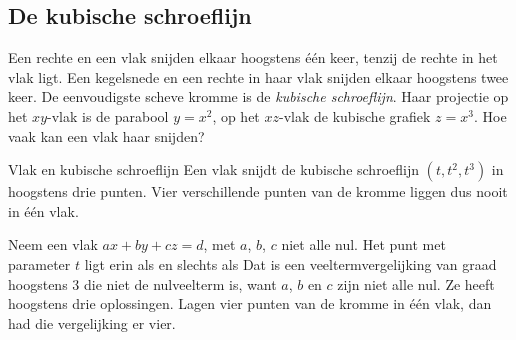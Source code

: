 
\begin{oefeningen}
\end{oefeningen}

\subsection{De kubische schroeflijn}

Een rechte en een vlak snijden elkaar hoogstens één keer, tenzij de rechte in het vlak ligt. Een kegelsnede en een rechte in haar vlak snijden elkaar hoogstens twee keer. De eenvoudigste scheve kromme is
de \textit{kubische schroeflijn}. Haar projectie op het $xy$-vlak is de parabool $y = x^2$, op het $xz$-vlak de kubische grafiek $z = x^3$. Hoe vaak kan een vlak haar snijden?

\begin{theorie}
\begin{stelling}{Vlak en kubische schroeflijn}
Een vlak snijdt de kubische schroeflijn $(t, t^2, t^3)$ in hoogstens drie punten. Vier verschillende punten van de kromme liggen dus nooit in één vlak.
\end{stelling}

\begin{bewijs}
Neem een vlak $ax + by + cz = d$, met $a$, $b$, $c$ niet alle nul. Het punt met parameter $t$ ligt erin als en slechts als
Dat is een veeltermvergelijking van graad hoogstens 3 die niet de nulveelterm is, want $a$, $b$ en $c$ zijn niet alle nul. Ze heeft hoogstens drie oplossingen. Lagen vier punten van de kromme in één vlak, dan had die vergelijking er vier.
\end{bewijs}
\end{theorie}


